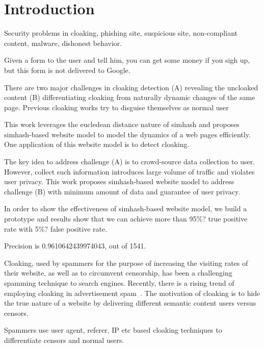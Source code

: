 \section{Introduction}
\label{s:intro}

Security problems in cloaking, phishing site, suspicious site, non-compliant
content, malware, dishonest behavior.

Given a form to the user and tell him, you can get some money if you sigh up,
but this form is not delivered to Google.






There are two major challenges in cloaking detection (A) revealing the
uncloaked content 
(B) differentiating cloaking from naturally dynamic changes of the same page.
Previous cloaking works try to disguise themselves as normal user


This work leverages the eucledean distance nature of simhash and proposes
simhash-based website model to model the dynamics of a web pages efficiently.
One application of this website model is to detect cloaking.

The key idea to address
challenge 
(A) is to crowd-source data collection to user. However, collect such
information 
introduces large volume of traffic and violates user privacy. 
This work proposes simhash-based website model to address challenge (B)
with minimum amount of data and guarantee of user privacy.

In order to show the effectiveness of simhash-based website model, we build
a prototype and results 
show that we can achieve more than 95\%? true positive rate with 5\%? false
positive rate.

Precision is 0.9610642439974043, out of 1541.









Cloaking, used by spammers for the purpose of increasing the visiting rates of
their website, as well as to circumvent censorship, has been a challenging
spamming technique to search engines. Recently, there is a rising trend of
employing cloaking in advertisement spam~\cite{li2012knowing}.  The motivation
of cloaking is to hide the true nature of a website by delivering different
semantic content users versus censors.

Spammers use user agent, referer, IP etc based cloaking techniques to
differentiate censors and normal users.

